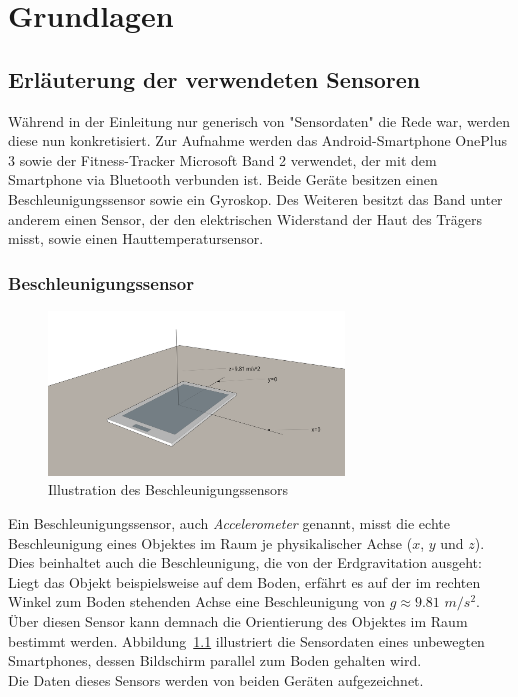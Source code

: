\chapter{Grundlagen}
\label{chap:background}
\section{Erläuterung der verwendeten Sensoren}
Während in der Einleitung nur generisch von "Sensordaten" die Rede war, werden diese nun konkretisiert. Zur Aufnahme werden das Android-Smartphone OnePlus 3 sowie der Fitness-Tracker Microsoft Band 2 verwendet, der mit dem Smartphone via Bluetooth verbunden ist. Beide Geräte besitzen einen Beschleunigungssensor sowie ein Gyroskop. Des Weiteren besitzt das Band unter anderem einen Sensor, der den elektrischen Widerstand der Haut des Trägers misst, sowie einen Hauttemperatursensor.

\subsection{Beschleunigungssensor}
\begin{figure}
\centering
\includegraphics[clip=true,trim=0mm 100mm 100mm 30mm, width=0.7\textwidth]{img/accelerometer}
\caption{Illustration des Beschleunigungssensors}
\label{fig:accelerometer}
\end{figure}
Ein Beschleunigungssensor, auch \textit{Accelerometer} genannt, misst die echte Beschleunigung eines Objektes im Raum je physikalischer Achse ($x$, $y$ und $z$). Dies beinhaltet auch die Beschleunigung, die von der Erdgravitation ausgeht: Liegt das Objekt beispielsweise auf dem Boden, erfährt es auf der im rechten Winkel zum Boden stehenden Achse eine Beschleunigung von $g \approx 9.81$ $m/s^2$\cite{SensorsOverview, nistsi}. Über diesen Sensor kann demnach die Orientierung des Objektes im Raum bestimmt werden. Abbildung~\ref{fig:accelerometer} illustriert die Sensordaten eines unbewegten Smartphones, dessen Bildschirm parallel zum Boden gehalten wird. \\
Die Daten dieses Sensors werden von beiden Geräten aufgezeichnet.

